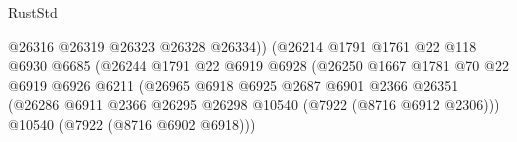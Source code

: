 \begin{lexlean}{RustStd}
\begin{coremodule}
                                                        @26316
                                                        @26319
                                                        @26323
                                                        @26328
                                                        @26334))
                                                    (@26214
                                                      @1791
                                                      @1761
                                                      @22
                                                      @118
                                                      @6930
                                                      @6685
                                                      (@26244
                                                        @1791
                                                        @22
                                                        @6919
                                                        @6928
                                                        (@26250
                                                          @1667
                                                          @1781
                                                          @70
                                                          @22
                                                          @6919
                                                          @6926
                                                          @6211
                                                          (@26965
                                                            @6918
                                                            @6925
                                                            @2687
                                                            @6901
                                                            @2366
                                                            @26351
                                                            (@26286
                                                              @6911
                                                              @2366
                                                              @26295
                                                              @26298
                                                              @10540
                                                              (@7922 (@8716 @6912 @2306)))
                                                            @10540
                                                            (@7922 (@8716 @6902 @6918)))

\end{coremodule}
\end{lexlean}
